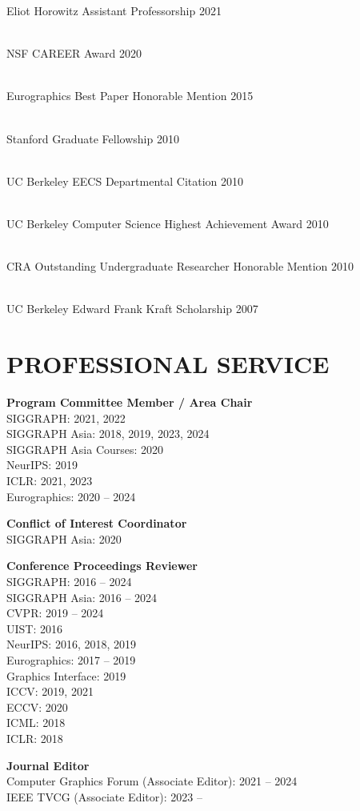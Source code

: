 \documentclass[line,margin]{res}
\begin{document}
\begin{resume}
\newcommand{\award}[2] {
	#1 \hfill #2
}

\award
{Eliot Horowitz Assistant Professorship}
{2021}
\\
\award
{NSF CAREER Award}
{2020}
\\
\award
{Eurographics Best Paper Honorable Mention}
{2015}
\\
\award
{Stanford Graduate Fellowship}
{2010}
\\
\award
{UC Berkeley EECS Departmental Citation}
{2010}
\\
\award
{UC Berkeley Computer Science Highest Achievement Award}
{2010}
\\
\award
{CRA Outstanding Undergraduate Researcher Honorable Mention}
{2010}
\\
\award
{UC Berkeley Edward Frank Kraft Scholarship}
{2007}


\section{PROFESSIONAL SERVICE}

\textbf{Program Committee Member / Area Chair}\\
SIGGRAPH: 2021, 2022\\
SIGGRAPH Asia: 2018, 2019, 2023, 2024\\
SIGGRAPH Asia Courses: 2020\\
NeurIPS: 2019\\
ICLR: 2021, 2023\\
Eurographics: 2020 -- 2024

\textbf{Conflict of Interest Coordinator}\\
SIGGRAPH Asia: 2020

\textbf{Conference Proceedings Reviewer}\\
SIGGRAPH: 2016 -- 2024\\
SIGGRAPH Asia: 2016 -- 2024\\
CVPR: 2019 -- 2024\\
UIST: 2016\\
NeurIPS: 2016, 2018, 2019\\
Eurographics: 2017 --  2019\\
Graphics Interface: 2019\\
ICCV: 2019, 2021\\
ECCV: 2020\\
ICML: 2018\\
ICLR: 2018

\textbf{Journal Editor}\\
Computer Graphics Forum (Associate Editor): 2021 -- 2024\\
IEEE TVCG (Associate Editor): 2023 --


\end{resume}
\end{document}
